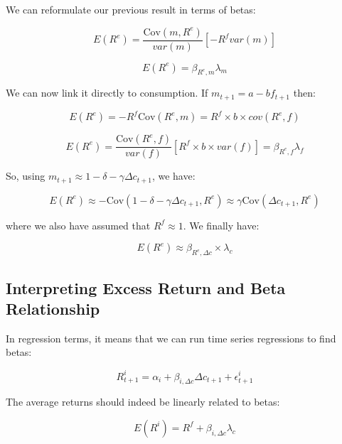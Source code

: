 We can reformulate our previous result in terms of betas:

\begin{equation}
    E(R^e) = \frac{\text{Cov}(m, R^e)}{var(m)}[-R^f var(m)]
\end{equation}

\begin{equation}
    E(R^e) = \beta_{R^e, m} \lambda_m
\end{equation}

We can now link it directly to consumption. If $m_{t+1} = a - bf_{t+1}$
then:

\begin{equation}
    E(R^e) = -R^f \text{Cov}(R^e, m) = R^f \times b \times cov(R^e, f)
\end{equation}

\begin{equation}
    E(R^e) = \frac{\text{Cov}(R^e,f)}{var(f)}[R^f \times b \times var(f)] = \beta_{R^e,f} \lambda_f
\end{equation}

So, using $m_{t+1} \approx 1 - \delta - \gamma \Delta c_{t+1}$, we have:

\begin{equation}
    E(R^e) \approx -\text{Cov}(1 - \delta - \gamma \Delta c_{t+1}, R^e) \approx \gamma \text{Cov}(\Delta c_{t+1}, R^e)
\end{equation}

where we also have assumed that $R^f \approx 1$. We finally have:

\begin{equation}
    E(R^e) \approx \beta_{R^e, \Delta c} \times \lambda_c
\end{equation}

\subsection{Interpreting Excess Return and Beta Relationship}

In regression terms, it means that we can run time series 
regressions to find betas:

\begin{equation}
    R^i_{t+1} = \alpha_i + \beta_{i,\Delta c} \Delta c_{t+1} + \epsilon^i_{t+1}
\end{equation}

The average returns should indeed be linearly related to 
betas:

\begin{equation}
    E(R^i) = R^f + \beta_{i,\Delta c} \lambda_c
\end{equation}

